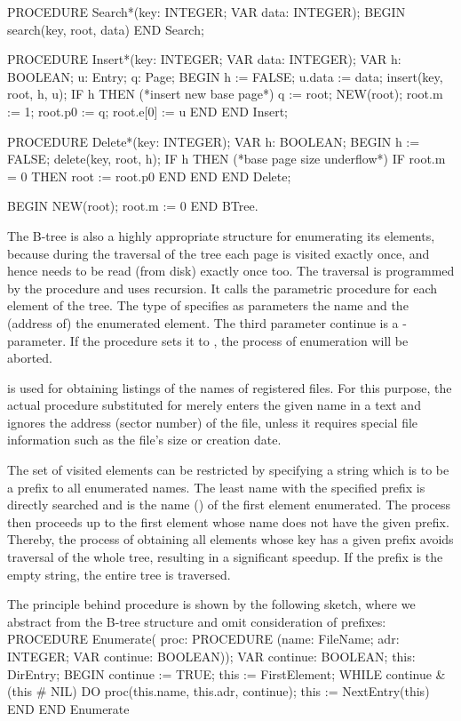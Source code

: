 PROCEDURE Search*(key: INTEGER; VAR data: INTEGER);
BEGIN search(key, root, data)
END Search;

PROCEDURE Insert*(key: INTEGER; VAR data: INTEGER);
  VAR h: BOOLEAN; u: Entry; q: Page;
BEGIN h := FALSE; u.data := data; insert(key, root, h, u);
  IF h THEN (*insert new base page*)
    q := root; NEW(root);
    root.m := 1; root.p0 := q; root.e[0] := u
  END
END Insert;

PROCEDURE Delete*(key: INTEGER);
  VAR h: BOOLEAN;
BEGIN h := FALSE; delete(key, root, h);
  IF h THEN (*base page size underflow*)
    IF root.m = 0 THEN root := root.p0 END
  END
END Delete;

BEGIN NEW(root); root.m := 0
END BTree.
\endtt

\noindent The B-tree is also a highly appropriate structure for enumerating its elements, because during the traversal of the tree each page is visited exactly once, and hence needs to be read (from disk) exactly once too. The traversal is programmed by the procedure  and uses recursion. It calls the parametric procedure  for each element of the tree. The type of  specifies as parameters the name and the (address of) the enumerated element. The third parameter continue is a  -parameter. If the procedure sets it to , the process of enumeration will be aborted.

 is used for obtaining listings of the names of registered files. For this purpose, the actual procedure substituted for  merely enters the given name in a text and ignores the address (sector number) of the file, unless it requires special file information such as the file's size or creation date.

The set of visited elements can be restricted by specifying a string which is to be a prefix to all enumerated names. The least name with the specified prefix is directly searched and is the name () of the first element enumerated. The process then proceeds up to the first element whose name does not have the given prefix. Thereby, the process of obtaining all elements whose key has a given prefix avoids traversal of the whole tree, resulting in a significant speedup. If the prefix is the empty string, the entire tree is traversed.

The principle behind procedure  is shown by the following sketch, where we abstract from the B-tree structure and omit consideration of prefixes:
\begintt
PROCEDURE Enumerate(
            proc: PROCEDURE (name: FileName; adr: INTEGER;
                             VAR continue: BOOLEAN));
  VAR continue: BOOLEAN; this: DirEntry;
BEGIN continue := TRUE; this := FirstElement;
  WHILE continue & (this # NIL) DO
    proc(this.name, this.adr, continue); this := NextEntry(this)
  END
END Enumerate
\endtt

